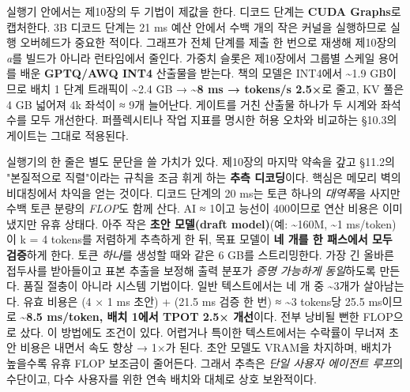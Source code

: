실행기 안에서는 제10장의 두 기법이 제값을 한다. 디코드 단계는 \textbf{CUDA Graphs}로 캡처한다. 3B 디코드 단계는 21 ms 예산 안에서 수백 개의 작은 커널을 실행하므로 실행 오버헤드가 중요한 적이다. 그래프가 전체 단계를 제출 한 번으로 재생해 제10장의 \textit{a}를 빌드가 아니라 런타임에서 줄인다. 가중치 슬롯은 제10장에서 그룹별 스케일 용어를 배운 \textbf{GPTQ/AWQ INT4} 산출물을 받는다. 책의 모델은 INT4에서 \textasciitilde{}1.9 GB이므로 배치 1 단계 트래픽이 \textasciitilde{}2.4 GB → \textbf{\textasciitilde{}8 ms → tokens/s 2.5×}로 줄고, KV 풀은 4 GB 넓어져 4k 좌석이 ≈ 9개 늘어난다. 게이트를 거친 산출물 하나가 두 시계와 좌석 수를 모두 개선한다. 퍼플렉시티나 작업 지표를 명시한 허용 오차와 비교하는 §10.3의 게이트는 그대로 적용된다.

실행기의 한 줄은 별도 문단을 쓸 가치가 있다. 제10장의 마지막 약속을 갚고 §11.2의 "본질적으로 직렬"이라는 규칙을 조금 휘게 하는 \textbf{추측 디코딩}이다. 핵심은 메모리 벽의 비대칭에서 차익을 얻는 것이다. 디코드 단계의 20 ms는 토큰 하나의 \textit{대역폭}을 사지만 수백 토큰 분량의 \textit{FLOP}도 함께 산다. AI ≈ 1이고 능선이 400이므로 연산 비용은 이미 냈지만 유휴 상태다. 아주 작은 \textbf{초안 모델(draft model)}(예: \textasciitilde{}160M, \textasciitilde{}1 ms/token)이 k = 4 tokens를 저렴하게 추측하게 한 뒤, 목표 모델이 \textbf{네 개를 한 패스에서 모두 검증}하게 한다. 토큰 \textit{하나}를 생성할 때와 같은 6 GB를 스트리밍한다. 가장 긴 올바른 접두사를 받아들이고 표본 추출을 보정해 출력 분포가 \textit{증명 가능하게 동일}하도록 만든다. 품질 절충이 아니라 시스템 기법이다. 일반 텍스트에서는 네 개 중 \textasciitilde{}3개가 살아남는다. 유효 비용은 (4 × 1 ms 초안) + (21.5 ms 검증 한 번) ≈ \textasciitilde{}3 tokens당 25.5 ms이므로 \textbf{\textasciitilde{}8.5 ms/token, 배치 1에서 TPOT 2.5× 개선}이다. 전부 낭비될 뻔한 FLOP으로 샀다. 이 방법에도 조건이 있다. 어렵거나 특이한 텍스트에서는 수락률이 무너져 초안 비용은 내면서 속도 향상 → 1×가 된다. 초안 모델도 VRAM을 차지하며, 배치가 높을수록 유휴 FLOP 보조금이 줄어든다. 그래서 추측은 \textit{단일 사용자 에이전트 루프}의 수단이고, 다수 사용자를 위한 연속 배치와 대체로 상호 보완적이다.

